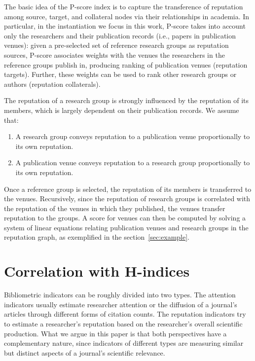 \documentclass[notitlepage]{svjour3}
\begin{document}
The basic idea of the P-score index is to capture the transference of reputation among source, target, and collateral nodes via their relationships in academia. In particular, in the instantiation we focus in this work, P-score takes into account only the  researchers and their publication records (i.e., papers in publication venues): given a pre-selected set of reference research groups as reputation sources, P-score associates weights with the venues the researchers in the reference groups publish in, producing ranking of publication venues (reputation targets). Further, these weights can be used to rank other research groups or authors (reputation collaterals).

The reputation of a research group is strongly influenced by the reputation of its members, which is largely dependent on their publication records. We assume that:
\begin{enumerate}
\item A research group conveys reputation to a publication venue proportionally to its own reputation.
\item A publication venue conveys reputation to a research group proportionally to its own reputation.
\end{enumerate}

Once a reference group is selected, the reputation of its members is transferred to the venues. Recursively, since the reputation of research groups is correlated with the reputation of the venues in which they published, the venues transfer reputation to the groups. A score for venues can then be computed by solving a system of linear equations relating publication venues and research groups in the reputation graph, as exemplified in the section~\ref{sec:example}.


\section{Correlation with H-indices} 
\label{sec:correlation}

Bibliometric indicators can be roughly divided into two types. The attention indicators usually 
estimate researcher attention or the diffusion of a journal's articles through different 
forms of citation counts. 
The reputation indicators try to estimate a researcher's reputation based on the researcher's 
overall scientific production.
What we argue in this paper is that both perspectives have a complementary nature,
since indicators of different types are measuring similar but distinct aspects of
a journal's scientific relevance. 
\end{document}
